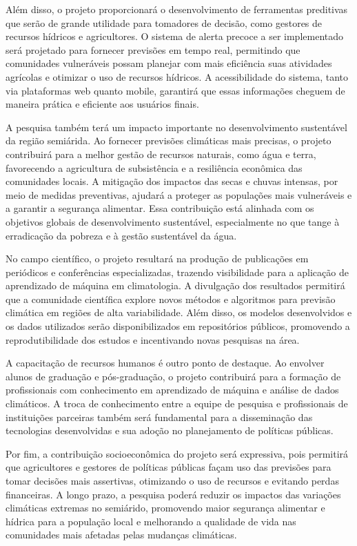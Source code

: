 \documentclass{projetodepesquisa} %
\begin{document}
	Além disso, o projeto proporcionará o desenvolvimento de ferramentas preditivas que serão de grande utilidade para tomadores de decisão, como gestores de recursos hídricos e agricultores. O sistema de alerta precoce a ser implementado será projetado para fornecer previsões em tempo real, permitindo que comunidades vulneráveis possam planejar com mais eficiência suas atividades agrícolas e otimizar o uso de recursos hídricos. A acessibilidade do sistema, tanto via plataformas web quanto mobile, garantirá que essas informações cheguem de maneira prática e eficiente aos usuários finais.
	
	A pesquisa também terá um impacto importante no desenvolvimento sustentável da região semiárida. Ao fornecer previsões climáticas mais precisas, o projeto contribuirá para a melhor gestão de recursos naturais, como água e terra, favorecendo a agricultura de subsistência e a resiliência econômica das comunidades locais. A mitigação dos impactos das secas e chuvas intensas, por meio de medidas preventivas, ajudará a proteger as populações mais vulneráveis e a garantir a segurança alimentar. Essa contribuição está alinhada com os objetivos globais de desenvolvimento sustentável, especialmente no que tange à erradicação da pobreza e à gestão sustentável da água.
	
	No campo científico, o projeto resultará na produção de publicações em periódicos e conferências especializadas, trazendo visibilidade para a aplicação de aprendizado de máquina em climatologia. A divulgação dos resultados permitirá que a comunidade científica explore novos métodos e algoritmos para previsão climática em regiões de alta variabilidade. Além disso, os modelos desenvolvidos e os dados utilizados serão disponibilizados em repositórios públicos, promovendo a reprodutibilidade dos estudos e incentivando novas pesquisas na área.
	
	A capacitação de recursos humanos é outro ponto de destaque. Ao envolver alunos de graduação e pós-graduação, o projeto contribuirá para a formação de profissionais com conhecimento em aprendizado de máquina e análise de dados climáticos. A troca de conhecimento entre a equipe de pesquisa e profissionais de instituições parceiras também será fundamental para a disseminação das tecnologias desenvolvidas e sua adoção no planejamento de políticas públicas.
	
	Por fim, a contribuição socioeconômica do projeto será expressiva, pois permitirá que agricultores e gestores de políticas públicas façam uso das previsões para tomar decisões mais assertivas, otimizando o uso de recursos e evitando perdas financeiras. A longo prazo, a pesquisa poderá reduzir os impactos das variações climáticas extremas no semiárido, promovendo maior segurança alimentar e hídrica para a população local e melhorando a qualidade de vida nas comunidades mais afetadas pelas mudanças climáticas.
	
\end{document}

